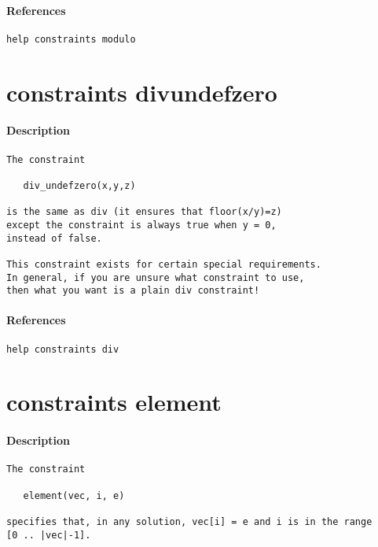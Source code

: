 \paragraph{References}
{\footnotesize
\begin{verbatim}
help constraints modulo
\end{verbatim}
}
\section{constraints div\textunderscore undefzero}
\paragraph{Description}
{\footnotesize
\begin{verbatim}
The constraint

   div_undefzero(x,y,z)

is the same as div (it ensures that floor(x/y)=z)
except the constraint is always true when y = 0,
instead of false.

This constraint exists for certain special requirements.
In general, if you are unsure what constraint to use,
then what you want is a plain div constraint!
\end{verbatim}
}
\paragraph{References}
{\footnotesize
\begin{verbatim}
help constraints div
\end{verbatim}
}
\section{constraints element}
\paragraph{Description}
{\footnotesize
\begin{verbatim}
The constraint

   element(vec, i, e)

specifies that, in any solution, vec[i] = e and i is in the range
[0 .. |vec|-1].
\end{verbatim}
}
